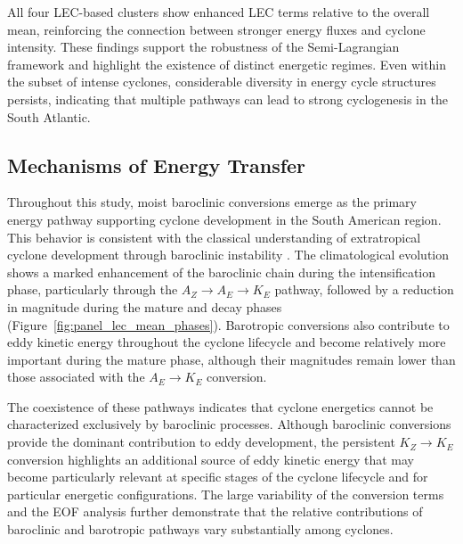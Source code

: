 \documentclass[pdflatex,sn-chicago]{sn-jnl}%
\theoremstyle{plain}
\theoremstyle{definition}
\theoremstyle{remark}
\theoremstyle{definition}
\begin{document}
All four LEC-based clusters show enhanced LEC terms relative to the overall mean, reinforcing the connection between stronger energy fluxes and cyclone intensity. These findings support the robustness of the Semi-Lagrangian framework and highlight the existence of distinct energetic regimes. Even within the subset of intense cyclones, considerable diversity in energy cycle structures persists, indicating that multiple pathways can lead to strong cyclogenesis in the South Atlantic.

\subsection{Mechanisms of Energy Transfer}

Throughout this study, moist baroclinic conversions emerge as the primary energy pathway supporting cyclone development in the South American region. This behavior is consistent with the classical understanding of extratropical cyclone development through baroclinic instability \citep{bjerknes1922life,charney1964growth,hoskins1990existence}. The climatological evolution shows a marked enhancement of the baroclinic chain during the intensification phase, particularly through the $A_Z \rightarrow A_E \rightarrow K_E$ pathway, followed by a reduction in magnitude during the mature and decay phases (Figure~\ref{fig:panel_lec_mean_phases}). Barotropic conversions also contribute to eddy kinetic energy throughout the cyclone lifecycle and become relatively more important during the mature phase, although their magnitudes remain lower than those associated with the $A_E \rightarrow K_E$ conversion.

The coexistence of these pathways indicates that cyclone energetics cannot be characterized exclusively by baroclinic processes. Although baroclinic conversions provide the dominant contribution to eddy development, the persistent $K_Z \rightarrow K_E$ conversion highlights an additional source of eddy kinetic energy that may become particularly relevant at specific stages of the cyclone lifecycle and for particular energetic configurations. The large variability of the conversion terms and the EOF analysis further demonstrate that the relative contributions of baroclinic and barotropic pathways vary substantially among cyclones.
\end{document}
